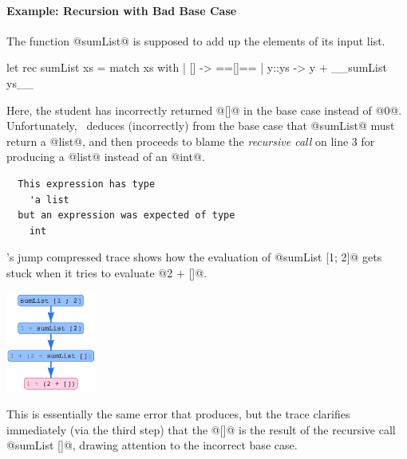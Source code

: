 \paragraph{Example: Recursion with Bad Base Case}
%
The function @sumList@ is supposed to add up
the elements of its input list.
%
\begin{ecode}
  let rec sumList xs = match xs with
    | []    -> ==[]==
    | y::ys -> y + __sumList ys__
\end{ecode}
%
Here, the student has incorrectly returned @[]@
in the base case instead of @0@.
%
Unfortunately, \ocaml\ deduces (incorrectly)
from the base case that @sumList@ must return
a @list@, and then proceeds to blame the
\emph{recursive call} on line 3 for
producing a @list@ instead of an @int@.
%
\begin{verbatim}
  This expression has type
    'a list
  but an expression was expected of type
    int
\end{verbatim}
%
\toolname's jump compressed trace shows how the evaluation of
@sumList [1; 2]@ gets stuck when it tries to evaluate @2 + []@.
%
\begin{center}
  \includegraphics[height=125px]{sumlist.png}
\end{center}
%
This is essentially the same error that \ocaml produces, but the trace
clarifies immediately (via the third step) that the @[]@ is the result
of the recursive call @sumList []@, drawing attention to the incorrect
base case.


